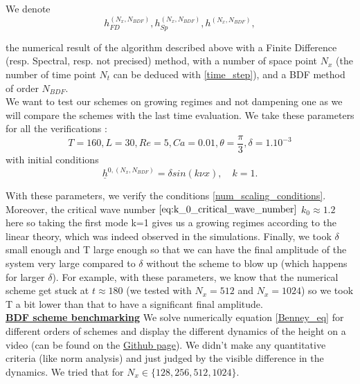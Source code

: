 \documentclass[12pt]{article}
\begin{document}
We denote 
\begin{equation}
    h_{FD}^{(N_x, N_{BDF})}, h_{Sp}^{(N_x, N_{BDF})}, h^{(N_x, N_{BDF})}, 
\end{equation} 

the numerical result of the algorithm described above with a Finite Difference (resp. Spectral, resp. not precised) method, with a number of space point $N_x$ (the number of time point $N_t$ can be deduced with \eqref{time_step}), and a BDF method of order $N_{BDF}$.
\\

We want to test our schemes on growing regimes and not dampening one as we will compare the schemes with the last time evaluation. We take these parameters for 
all the verifications :
\begin{equation}\label{eq_value_variables_num_verif}
\boxed{
    T = 160, L=30, Re=5, Ca= 0.01, \theta = \frac{\pi}{3}, \delta = 1.10^{-3}
    }
\end{equation}
with initial conditions
\begin{equation}
    \underline{h}^{0, (N_x, N_{BDF})} = \delta sin(k\nu x), \quad k=1.
\end{equation}

With these parameters, we verify the conditions \eqref{num_scaling_conditions}. Moreover, the critical wave number $\eqref{eq:k_0_critical_wave_number}$ $k_0\approx 1.2$ here so taking the first mode k=1 gives us a growing regimes according to the linear theory, which was indeed observed in the simulations. Finally, we took $\delta$ small enough and T large enough so that we can have the final amplitude of the system very large compared to $\delta$ without the scheme to blow up (which happens for larger $\delta$). For example, with these parameters, we know that the numerical scheme get stuck at $t\approx180$ (we tested with $N_x=512$ and $N_x=1024$) so we took T a bit lower than that to have a significant final amplitude. 
\\

\underline{\textbf{BDF scheme benchmarking}}
We solve numerically equation \eqref{Benney_eq} for different orders of schemes and display the different dynamics of the height on a video (can be found on the \href{https://github.com/Bilal59170/Repo_Warwick_internship}{Github page}). We didn't make any quantitative criteria (like norm analysis) and just judged by the visible difference in the dynamics. We tried that for $N_x \in \{128, 256, 512, 1024\}.$
\end{document}
